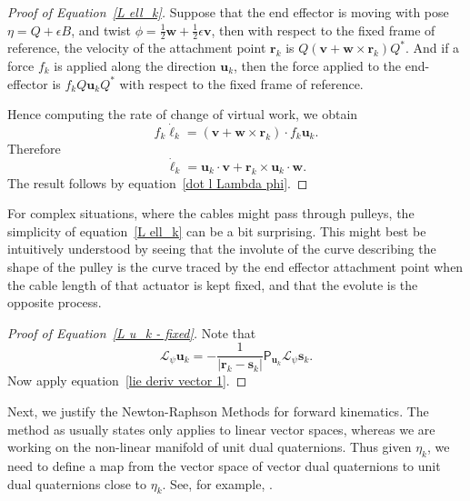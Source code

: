 \documentclass[reqno,12pt]{amsart}
\begin{document}
\begin{proof}[Proof of Equation~\eqref{L ell_k}]
Suppose that the end effector is moving with pose $\eta = Q + \epsilon B$, and twist $\phi = \tfrac12 \bm w + \tfrac12 \epsilon \bm v$, then with respect to the fixed frame of reference, the velocity of the attachment point $\bm r_k$ is $Q (\bm v + \bm w \times \bm r_k)Q^*$.  And if a force $f_k$ is applied along the direction $\bm u_k$, then the force applied to the end-effector is $f_k Q\bm u_kQ^*$ with respect to the fixed frame of reference.

Hence computing the rate of change of virtual work, we obtain
\begin{equation}
f_k \dot \ell_k = (\bm v + \bm w \times \bm r_k) \cdot f_k \bm u_k.
\end{equation}
Therefore
\begin{equation}
\dot \ell_k = \bm u_k \cdot \bm v + \bm r_k \times \bm u_k \cdot \bm w .
\end{equation}
The result follows by equation~\eqref{dot l Lambda phi}.
\end{proof}

For complex situations, where the cables might pass through pulleys, the simplicity of equation~\eqref{L ell_k} can be a bit surprising.  This might best be intuitively understood by seeing that the involute of the curve describing the shape of the pulley is the curve traced by the end effector attachment point when the cable length of that actuator is kept fixed, and that the evolute is the opposite process.

\begin{proof}[Proof of Equation~\eqref{L u_k - fixed}]
Note that
\begin{equation}
\mathcal L_\psi \bm u_k
= - \frac1{|\bm r_k - \bm s_k|}\mathsf P_{\bm u_k} \mathcal L_\psi \bm s_k.
\end{equation}
Now apply equation~\eqref{lie deriv vector 1}.
\end{proof}


\bigskip

Next, we justify the Newton-Raphson Methods for forward kinematics.  The method as usually states only applies to linear vector spaces, whereas we are working on the non-linear manifold of unit dual quaternions.  Thus given $\eta_k$, we need to define a map from the vector space of vector dual quaternions to unit dual quaternions close to $\eta_k$.  See, for example, \cite{huper-trumpf}.
\end{document}

